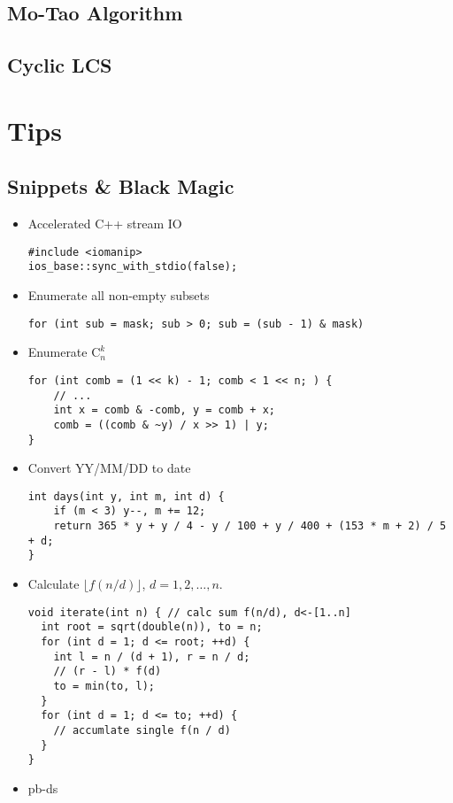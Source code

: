 \documentclass[10pt]{article}
\begin{document}
\subsection{Mo-Tao Algorithm}

\subsection{Cyclic LCS}


\section{Tips}
\subsection{Snippets \& Black Magic}
\begin{itemize}
\item Accelerated C++ stream IO
\begin{lstlisting}[frame=none]
#include <iomanip>
ios_base::sync_with_stdio(false);
\end{lstlisting}
\item Enumerate all non-empty subsets
\begin{lstlisting}[frame=none]
for (int sub = mask; sub > 0; sub = (sub - 1) & mask)
\end{lstlisting}
\item Enumerate $\mathrm{C}_{n}^{k}$
\begin{lstlisting}[frame=none]
for (int comb = (1 << k) - 1; comb < 1 << n; ) {
	// ...
	int x = comb & -comb, y = comb + x;
	comb = ((comb & ~y) / x >> 1) | y;
}
\end{lstlisting}
\item Convert YY/MM/DD to date
\begin{lstlisting}[frame=none]
int days(int y, int m, int d) {
	if (m < 3) y--, m += 12;
	return 365 * y + y / 4 - y / 100 + y / 400 + (153 * m + 2) / 5 + d;
}
\end{lstlisting}
\item Calculate $\lfloor f(n/d) \rfloor$, $d=1, 2, \ldots, n$.
\begin{lstlisting}[frame=none]
void iterate(int n) { // calc sum f(n/d), d<-[1..n]
  int root = sqrt(double(n)), to = n;
  for (int d = 1; d <= root; ++d) {
    int l = n / (d + 1), r = n / d;
    // (r - l) * f(d)
    to = min(to, l);
  }
  for (int d = 1; d <= to; ++d) {
    // accumlate single f(n / d)
  }
}
\end{lstlisting}
\item pb-ds

\end{itemize}
\end{document}
